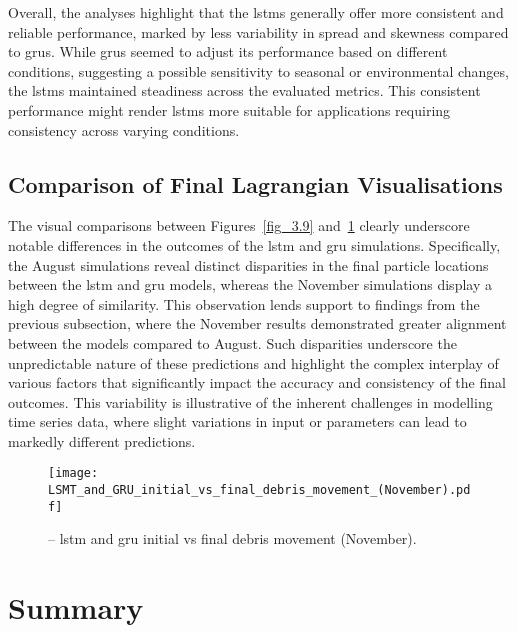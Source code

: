Overall, the analyses highlight that the \acrshort{lstm}s generally offer more consistent and reliable performance, marked by less variability in spread and skewness compared to \acrshort{gru}s. While \acrshort{gru}s seemed to adjust its performance based on different conditions, suggesting a possible sensitivity to seasonal or environmental changes, the \acrshort{lstm}s maintained steadiness across the evaluated metrics. This consistent performance might render \acrshort{lstm}s more suitable for applications requiring consistency across varying conditions.

\subsection{Comparison of Final Lagrangian Visualisations}
\label{subsec:4.2.4}

The visual comparisons between Figures~\ref{fig_3.9} and~\ref{fig_4.8} clearly underscore notable differences in the outcomes of the \acrshort{lstm} and \acrshort{gru} simulations. Specifically, the August simulations reveal distinct disparities in the final particle locations between the \acrshort{lstm} and \acrshort{gru} models, whereas the November simulations display a high degree of similarity. This observation lends support to findings from the previous subsection, where the November results demonstrated greater alignment between the models compared to August. Such disparities underscore the unpredictable nature of these predictions and highlight the complex interplay of various factors that significantly impact the accuracy and consistency of the final outcomes. This variability is illustrative of the inherent challenges in modelling time series data, where slight variations in input or parameters can lead to markedly different predictions.

\begin{figure}[htbp]
    \centering
    \texttt{[image: LSMT\_and\_GRU\_initial\_vs\_final\_debris\_movement\_(November).pdf]}
    \caption[LSTM and GRU initial vs final debris movement (November).]{-- \acrshort{lstm} and \acrshort{gru} initial vs final debris movement (November).\label{fig_4.8}}
\end{figure}

\vspace{-1cm}
\section{Summary}
\label{sec:4.3}

